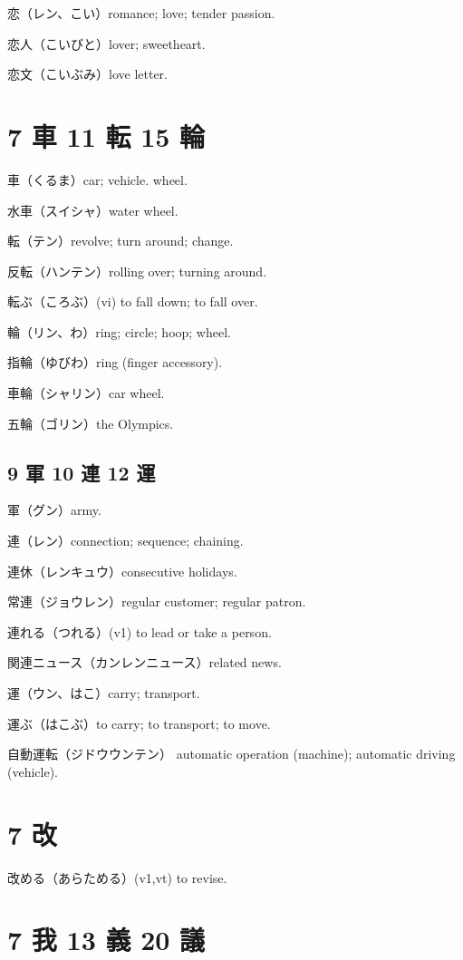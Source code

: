 恋（レン、こい）romance; love; tender passion.

恋人（こいびと）lover; sweetheart.

恋文（こいぶみ）love letter.

\section{7 車 11 転 15 輪}

車（くるま）car; vehicle. wheel.

水車（スイシャ）water wheel.

転（テン）revolve; turn around; change.

反転（ハンテン）rolling over; turning around.

転ぶ（ころぶ）(vi) to fall down; to fall over.

輪（リン、わ）ring; circle; hoop; wheel.

指輪（ゆびわ）ring (finger accessory).

車輪（シャリン）car wheel.

五輪（ゴリン）the Olympics.

\subsection{9 軍 10 連 12 運}

軍（グン）army.

連（レン）connection; sequence; chaining.

連休（レンキュウ）consecutive holidays.

常連（ジョウレン）regular customer; regular patron.

連れる（つれる）(v1) to lead or take a person.

関連ニュース（カンレンニュース）related news.

運（ウン、はこ）carry; transport.

運ぶ（はこぶ）to carry; to transport; to move.

自動運転（ジドウウンテン）
automatic operation (machine); automatic driving (vehicle).

\section{7 改}

改める（あらためる）(v1,vt) to revise.

\section{7 我 13 義 20 議}

